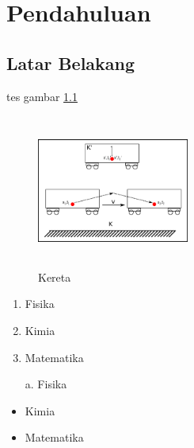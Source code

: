 \documentclass{book}
\begin{document}
\chapter{Pendahuluan}

\section{Latar Belakang}
tes gambar \ref{gb:kereta}

\begin{figure}[h]
\label{gb:kereta}
\centering
\includegraphics[width=5cm, height=5cm]{kereta.png}
\caption{Kereta}
\end{figure}

\begin{enumerate}
\item Fisika
\item Kimia
\item Matematika
\end{enumerate}

\begin{itemize}
\item[a.] Fisika
\item Kimia
\item Matematika
\end{itemize}
\end{document}
